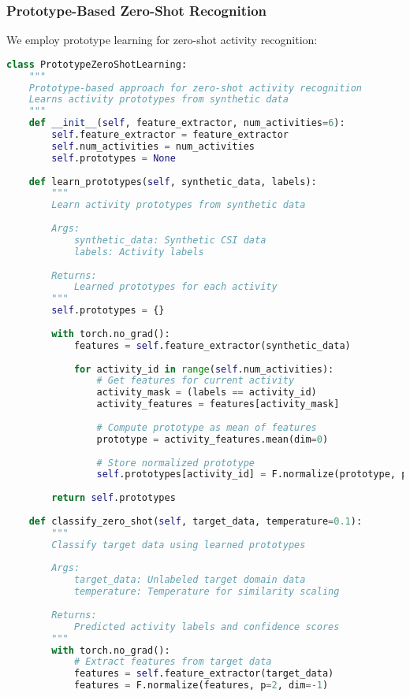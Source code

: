\documentclass[journal]{IEEEtran}
\begin{document}
\subsubsection{Prototype-Based Zero-Shot Recognition}

We employ prototype learning for zero-shot activity recognition:

\begin{lstlisting}[language=Python, caption=Prototype-Based Zero-Shot Learning]
class PrototypeZeroShotLearning:
    """
    Prototype-based approach for zero-shot activity recognition
    Learns activity prototypes from synthetic data
    """
    def __init__(self, feature_extractor, num_activities=6):
        self.feature_extractor = feature_extractor
        self.num_activities = num_activities
        self.prototypes = None
        
    def learn_prototypes(self, synthetic_data, labels):
        """
        Learn activity prototypes from synthetic data
        
        Args:
            synthetic_data: Synthetic CSI data
            labels: Activity labels
        
        Returns:
            Learned prototypes for each activity
        """
        self.prototypes = {}
        
        with torch.no_grad():
            features = self.feature_extractor(synthetic_data)
            
            for activity_id in range(self.num_activities):
                # Get features for current activity
                activity_mask = (labels == activity_id)
                activity_features = features[activity_mask]
                
                # Compute prototype as mean of features
                prototype = activity_features.mean(dim=0)
                
                # Store normalized prototype
                self.prototypes[activity_id] = F.normalize(prototype, p=2, dim=-1)
        
        return self.prototypes
    
    def classify_zero_shot(self, target_data, temperature=0.1):
        """
        Classify target data using learned prototypes
        
        Args:
            target_data: Unlabeled target domain data
            temperature: Temperature for similarity scaling
        
        Returns:
            Predicted activity labels and confidence scores
        """
        with torch.no_grad():
            # Extract features from target data
            features = self.feature_extractor(target_data)
            features = F.normalize(features, p=2, dim=-1)
            

\end{lstlisting}
\end{document}
